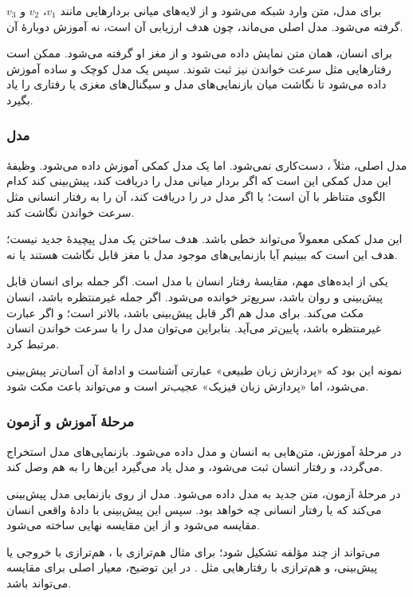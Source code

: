 برای مدل، متن وارد شبکه می‌شود و از لایه‌های میانی بردارهایی مانند \(v_1\)، \(v_2\) و \(v_3\) گرفته می‌شود. مدل اصلی  می‌ماند، چون هدف ارزیابی آن است، نه آموزش دوبارهٔ آن.

برای انسان، همان متن نمایش داده می‌شود و از مغز او  گرفته می‌شود. ممکن است رفتارهایی مثل سرعت خواندن نیز ثبت شوند. سپس یک مدل کوچک و ساده آموزش داده می‌شود تا نگاشت میان بازنمایی‌های مدل و سیگنال‌های مغزی یا رفتاری را یاد بگیرد.

\subsubsection{مدل }
مدل اصلی، مثلاً ، دست‌کاری نمی‌شود. اما یک مدل کمکی آموزش داده می‌شود. وظیفهٔ این مدل کمکی این است که اگر بردار میانی مدل را دریافت کند، پیش‌بینی کند کدام الگوی  متناظر با آن است؛ یا اگر  مدل در  را دریافت کند، آن را به رفتار انسانی مثل سرعت خواندن نگاشت کند.

این مدل کمکی معمولاً می‌تواند خطی باشد. هدف ساختن یک مدل پیچیدهٔ جدید نیست؛ هدف این است که ببینیم آیا بازنمایی‌های موجود مدل با مغز قابل نگاشت هستند یا نه.

یکی از ایده‌های مهم، مقایسهٔ رفتار انسان با  مدل است. اگر جمله برای انسان قابل پیش‌بینی و روان باشد، سریع‌تر خوانده می‌شود. اگر جمله غیرمنتظره باشد، انسان مکث می‌کند. برای مدل هم اگر  قابل پیش‌بینی باشد،  بالاتر است؛ و اگر عبارت غیرمنتظره باشد،  پایین‌تر می‌آید. بنابراین می‌توان  مدل را با سرعت خواندن انسان مرتبط کرد.

نمونه این بود که «پردازش زبان طبیعی» عبارتی آشناست و ادامهٔ آن آسان‌تر پیش‌بینی می‌شود، اما «پردازش زبان فیزیک» عجیب‌تر است و می‌تواند باعث مکث شود.

\subsubsection{مرحلهٔ آموزش و آزمون}
در مرحلهٔ آموزش، متن‌هایی به انسان و مدل داده می‌شود. بازنمایی‌های مدل استخراج می‌گردد،  و رفتار انسان ثبت می‌شود، و مدل  یاد می‌گیرد این‌ها را به هم وصل کند.

در مرحلهٔ آزمون، متن جدید به مدل داده می‌شود. مدل  از روی بازنمایی مدل پیش‌بینی می‌کند که  یا رفتار انسانی چه خواهد بود. سپس این پیش‌بینی با دادهٔ واقعی انسان مقایسه می‌شود و از این مقایسه  نهایی ساخته می‌شود.

 می‌تواند از چند مؤلفه تشکیل شود؛ برای مثال هم‌ترازی با ، هم‌ترازی با خروجی یا پیش‌بینی، و هم‌ترازی با رفتارهایی مثل . در این توضیح، معیار اصلی برای مقایسه می‌تواند  باشد.

